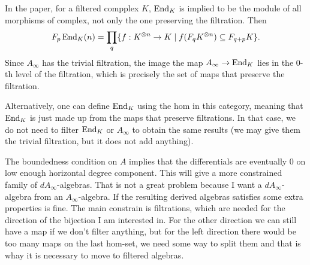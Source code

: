 \documentclass[twoside]{article}
\begin{document}
\begin{remark}
In the paper, for a filtered compplex $K$, $\operatorname{End}_K$ is implied to be the module of all morphisms of complex, not only the one preserving the filtration. Then \[F_p\operatorname{End}_K(n)=\prod_q\{f:K^{\otimes n}\to K\mid f(F_qK^{\otimes n})\subseteq F_{q+p}K\}.\]
Since $A_\infty$ has the trivial filtration, the image the map $A_\infty\to\operatorname{End}_K$ lies in the 0-th level of the filtration, which is precisely the set of maps that preserve the filtration.

Alternatively, one can define $\operatorname{End}_K$ using the hom in this category, meaning that $\operatorname{End}_K$ is just made up from the maps that preserve filtrations. In that case, we do not need to filter $\operatorname{End}_K$ or $A_\infty$ to obtain the same results (we may give them the trivial filtration, but it does not add anything).
\end{remark}

\begin{remark}
The boundedness condition on $A$ implies that the differentials are eventually 0 on low enough horizontal degree component. This will give a more constrained family of $dA_\infty$-algebras. That is not a great problem because I want a $dA_\infty$-algebra from an $A_\infty$-algebra. If the resulting derived algebras satisfies some extra properties is fine. The main constrain is filtrations, which are needed for the direction of the bijection I am interested in. For the other direction we can still have a map if we don't filter anything, but for the left direction there would be too many maps on the last hom-set,  we need some way to split them and that is whay  it is necessary to move to filtered algebras.
\end{remark}
\end{document}
